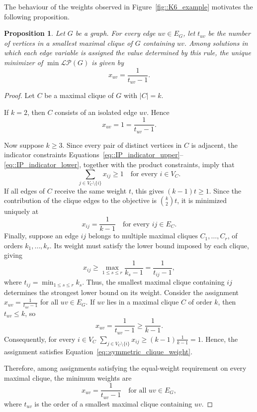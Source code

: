 \documentclass[11pt]{report}
\newtheorem{proposition}{Proposition}
\begin{document}
The behaviour of the weights observed in Figure~\ref{fig::K6_example} motivates the following proposition. 

\begin{proposition} \label{prop::unique_symmetric_minimizer}
  Let $G$ be a graph. For every edge $uv\in E_G$, let $t_{uv}$ be the number of vertices in a smallest maximal clique of $G$ containing $uv$. Among solutions in which each edge variable is assigned the value determined by this rule, the unique minimizer of $\min\mathcal{LP}(G)$ is given by
  \[
  x_{uv}=\frac{1}{t_{uv}-1}.
  \]
\end{proposition}
\begin{proof}
  Let $C$ be a maximal clique of $G$ with $|C|=k$.

  If $k=2$, then $C$ consists of an isolated edge $uv$. Hence
  \[
  x_{uv}=1=\frac{1}{t_{uv}-1}.
  \]

  Now suppose $k \geq 3$. Since every pair of distinct vertices in $C$ is adjacent, the indicator constraints Equations~\eqref{eq::IP_indicator_upper}--\eqref{eq::IP_indicator_lower}, together with the product constraints, imply that
  \[
  \sum_{j\in V_C\setminus\{i\}} x_{ij} \geq 1 \quad \text{for every } i\in V_C.
  \]
  If all edges of $C$ receive the same weight $t$, this gives $(k-1)t \geq 1$. Since the contribution of the clique edges to the objective is $\displaystyle \binom{k}{2}t$, it is minimized uniquely at
  \begin{equation} \label{eq::symmetric_clique_weight}
    x_{ij}=\frac{1}{k-1} \quad \text{for every } ij\in E_C.
  \end{equation}
  Finally, suppose an edge $ij$ belongs to multiple maximal cliques $C_1,\ldots,C_r$, of orders $k_1,\ldots,k_r$. Its weight must satisfy the lower bound imposed by each clique, giving
  \[
  x_{ij}\geq \max_{1\leq s\leq r}\frac{1}{k_s-1} =\frac{1}{t_{ij}-1},
  \]
  where $t_{ij}=\min_{1\leq s\leq r}k_s$. Thus, the smallest maximal clique containing $ij$ determines the strongest lower bound on its weight. Consider the assignment $ \displaystyle x_{uv}=\frac{1}{t_{uv}-1}$ for all $uv \in E_G$. If $uv$ lies in a maximal clique $C$ of order $k$, then  $t_{uv}\leq k$, so
  \[
  x_{uv}=\frac{1}{t_{uv}-1}\geq\frac{1}{k-1}.
  \]
  Consequently, for every $i\in V_C$ $\displaystyle \sum_{j\in V_C\setminus\{i\}}x_{ij} \geq (k-1)\frac{1}{k-1}=1$. Hence, the assignment satisfies Equation~\eqref{eq::symmetric_clique_weight}.

  Therefore, among assignments satisfying the equal-weight requirement on every maximal clique, the minimum weights are
  \[
  x_{uv}=\frac{1}{t_{uv}-1} \quad \text{for all } uv\in E_G,
  \]
  where $t_{uv}$ is the order of a smallest maximal clique containing $uv$.
\end{proof}
\end{document}

